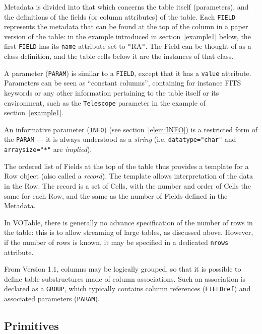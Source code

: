 \documentclass[11pt,a4paper]{ivoa}
\def\Aref#1{section~\ref{#1}}
\def\Arefs#1{section~\ref{#1}}
\let\fg=\color
\def\attr#1{{\tt{\fg{DarkRed}#1}}}
\def\elem#1{{\tt{\fg{DarkRed}#1}}}
\def\attrval#1#2{{\tt{\fg{DarkRed}#1}="{\fg{DarkPurple}#2}"}}
\def\literalvalue#1{{\tt"}{{\fg{DarkPurple}#1}}{\tt"}}
\begin{document}
\medskip
\par\noindent
Metadata is divided into that which concerns the table itself
(parameters), and the definitions of the fields (or column
attributes) of the table.
Each \elem{FIELD} represents the metadata
that can be found at the
top of the column in a paper version of the table:
in the example introduced in \Aref{example1}
below, the first \elem{FIELD} has its \attr{name} attribute
set to \literalvalue{RA}. The Field can be thought of as a class definition,
and the table cells below it are the instances of that class.

A parameter ({\elem{PARAM}})
is similar to a {\elem{FIELD}},
except that it has a \attr{value} attribute.
Parameters can be seen as ``constant columns'', containing for instance
FITS keywords or any other
information pertaining to the table itself or its environment, such as the
{\tt Telescope} parameter in the example of \Arefs{example1}.

An informative parameter ({\elem{INFO}}) (see \Arefs{elem:INFO})
is a restricted form of the {\elem{PARAM}} ---  it is always understood
as a {\em string} (i.e. \attrval{datatype}{char}
and \attrval{arraysize}{*} are {\em implied}).

\mbox{}{\color{black}}%
%
The ordered list of Fields at the top of the table thus provides a
template for a Row object (also called a {\it record}). The
template allows interpretation of the data in the Row.
The
record is a set of Cells, with the number and order of Cells the same for each
Row, and the same as the number of Fields defined in the Metadata.

In VOTable,
there is generally no advance specification of the number of rows in the table:
this is to allow streaming of large tables, as discussed above.
However, if the number of rows is known, it may be specified in a
dedicated \attr{nrows} attribute.

From Version 1.1, columns may be logically grouped, so that it is
possible to define table substructures made of column associations.
Such an association is declared as a \elem{GROUP}, which typically
contains column references (\elem{FIELDref})
and associated parameters (\elem{PARAM}).

\subsection{Primitives}
\label{sec:primitives}
\end{document}
